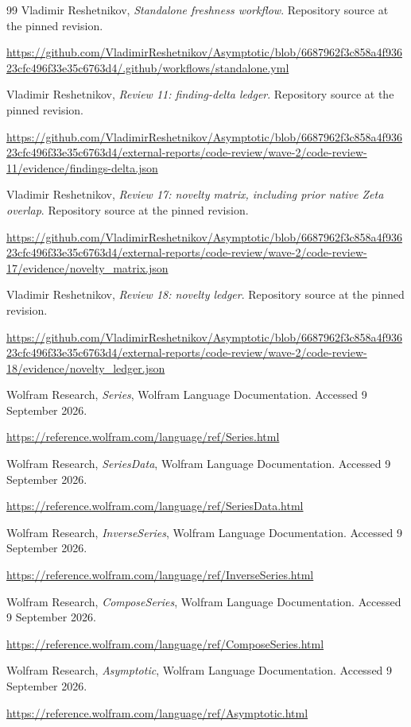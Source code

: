 \documentclass[11pt,a4paper]{article}
\begin{document}
\begin{thebibliography}{99}
 Vladimir Reshetnikov, \emph{Standalone freshness workflow}. Repository source at the pinned revision.\par
\url{https://github.com/VladimirReshetnikov/Asymptotic/blob/6687962f3c858a4f93623cfc496f33e35c6763d4/.github/workflows/standalone.yml}

 Vladimir Reshetnikov, \emph{Review 11: finding-delta ledger}. Repository source at the pinned revision.\par
\url{https://github.com/VladimirReshetnikov/Asymptotic/blob/6687962f3c858a4f93623cfc496f33e35c6763d4/external-reports/code-review/wave-2/code-review-11/evidence/findings-delta.json}

 Vladimir Reshetnikov, \emph{Review 17: novelty matrix, including prior native Zeta overlap}. Repository source at the pinned revision.\par
\url{https://github.com/VladimirReshetnikov/Asymptotic/blob/6687962f3c858a4f93623cfc496f33e35c6763d4/external-reports/code-review/wave-2/code-review-17/evidence/novelty_matrix.json}

 Vladimir Reshetnikov, \emph{Review 18: novelty ledger}. Repository source at the pinned revision.\par
\url{https://github.com/VladimirReshetnikov/Asymptotic/blob/6687962f3c858a4f93623cfc496f33e35c6763d4/external-reports/code-review/wave-2/code-review-18/evidence/novelty_ledger.json}

 Wolfram Research, \emph{Series}, Wolfram Language Documentation. Accessed 9 September 2026.\par
\url{https://reference.wolfram.com/language/ref/Series.html}

 Wolfram Research, \emph{SeriesData}, Wolfram Language Documentation. Accessed 9 September 2026.\par
\url{https://reference.wolfram.com/language/ref/SeriesData.html}

 Wolfram Research, \emph{InverseSeries}, Wolfram Language Documentation. Accessed 9 September 2026.\par
\url{https://reference.wolfram.com/language/ref/InverseSeries.html}

 Wolfram Research, \emph{ComposeSeries}, Wolfram Language Documentation. Accessed 9 September 2026.\par
\url{https://reference.wolfram.com/language/ref/ComposeSeries.html}

 Wolfram Research, \emph{Asymptotic}, Wolfram Language Documentation. Accessed 9 September 2026.\par
\url{https://reference.wolfram.com/language/ref/Asymptotic.html}


\end{thebibliography}
\end{document}
